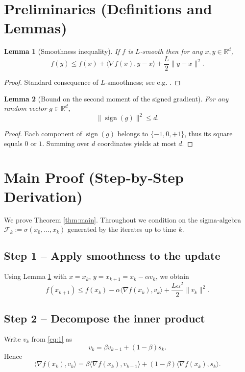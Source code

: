 \documentclass{article}
\newtheorem{lemma}{Lemma}
\newcommand{\sign}{\operatorname{sign}}
\newcommand{\R}{\mathbb{R}}
\begin{document}
\section*{Preliminaries (Definitions and Lemmas)}
\begin{lemma}[Smoothness inequality]\label{lem:smooth}
If $f$ is $L$‑smooth then for any $x,y\in\R^{d}$,
\[
f(y)\le f(x)+\langle\nabla f(x),y-x\rangle+\frac{L}{2}\|y-x\|^{2}.
\]
\end{lemma}
\begin{proof}
Standard consequence of $L$‑smoothness; see e.g. \cite{nesterov2004introductory}. \qedhere
\end{proof}

\begin{lemma}[Bound on the second moment of the signed gradient]\label{lem:signbound}
For any random vector $g\in\R^{d}$,
\[
\|\sign(g)\|^{2}\le d.
\]
\end{lemma}
\begin{proof}
Each component of $\sign(g)$ belongs to $\{-1,0,+1\}$, thus its square equals $0$ or $1$. Summing over $d$ coordinates yields at most $d$. \qedhere
\end{proof}

\section*{Main Proof (Step‑by‑Step Derivation)}
We prove Theorem \ref{thm:main}. Throughout we condition on the sigma‑algebra $\mathcal{F}_k:=\sigma(x_0,\dots,x_k)$ generated by the iterates up to time $k$.

\subsection*{Step 1 – Apply smoothness to the update}
Using Lemma \ref{lem:smooth} with $x=x_k$, $y=x_{k+1}=x_k-\alpha v_k$, we obtain
\[
f(x_{k+1})\le f(x_k)-\alpha\langle\nabla f(x_k),v_k\rangle+\frac{L\alpha^{2}}{2}\|v_k\|^{2}.
\tag{3}
\]

\subsection*{Step 2 – Decompose the inner product}
Write $v_k$ from \eqref{eq:1} as
\[
v_k=\beta v_{k-1}+(1-\beta)s_k.
\]
Hence
\[
\langle\nabla f(x_k),v_k\rangle
= \beta\langle\nabla f(x_k),v_{k-1}\rangle+(1-\beta)\langle\nabla f(x_k),s_k\rangle.
\tag{4}
\]
\end{document}
